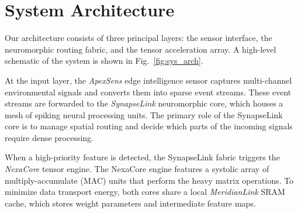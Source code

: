 \section{System Architecture}
\label{sec:architecture}

Our architecture consists of three principal layers: the sensor interface, the neuromorphic routing fabric, and the tensor acceleration array. A high-level schematic of the system is shown in Fig.~\ref{fig:sys_arch}.

At the input layer, the \textit{ApexSens} edge intelligence sensor captures multi-channel environmental signals and converts them into sparse event streams. These event streams are forwarded to the \textit{SynapseLink} neuromorphic core, which houses a mesh of spiking neural processing units. The primary role of the SynapseLink core is to manage spatial routing and decide which parts of the incoming signals require dense processing.

When a high-priority feature is detected, the SynapseLink fabric triggers the \textit{NexaCore} tensor engine. The NexaCore engine features a systolic array of multiply-accumulate (MAC) units that perform the heavy matrix operations. To minimize data transport energy, both cores share a local \textit{MeridianLink} SRAM cache, which stores weight parameters and intermediate feature maps.

